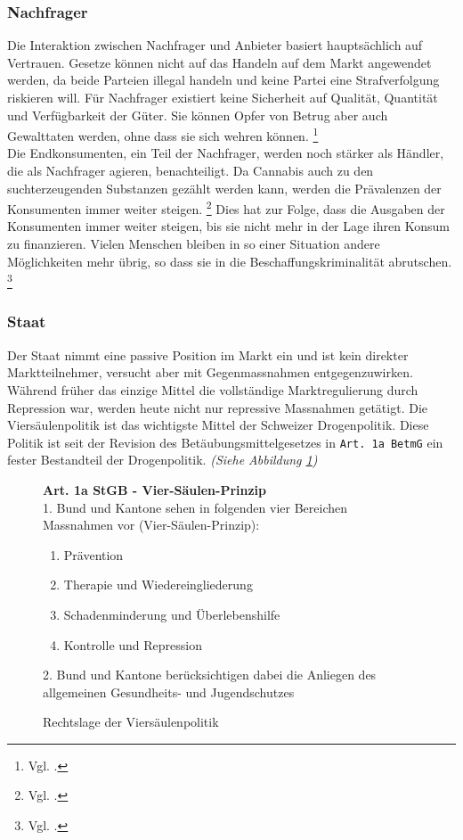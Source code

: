 \documentclass[../main.tex]{subfiles}
\begin{document}
	
	\subsubsection{Nachfrager}
	Die Interaktion zwischen Nachfrager und Anbieter basiert hauptsächlich auf Vertrauen.
	Gesetze können nicht auf das Handeln auf dem Markt angewendet werden, da beide Parteien illegal handeln und keine Partei eine Strafverfolgung riskieren will.
	Für Nachfrager existiert keine Sicherheit auf Qualität, Quantität und Verfügbarkeit der Güter.
	Sie können Opfer von Betrug aber auch Gewalttaten werden, ohne dass sie sich wehren können.%
	\footnote{Vgl. \cite{departmentofjustice-1994}.}\\
	
	\noindent	
	Die Endkonsumenten, ein Teil der Nachfrager, werden noch stärker als Händler, die als Nachfrager agieren, benachteiligt.
	Da Cannabis auch zu den suchterzeugenden Substanzen gezählt werden kann, werden die Prävalenzen der Konsumenten immer weiter steigen.%
	\footnote{Vgl. \cite{becker}.}
	Dies hat zur Folge, dass die Ausgaben der Konsumenten immer weiter steigen, bis sie nicht mehr in der Lage ihren Konsum zu finanzieren.
	Vielen Menschen bleiben in so einer Situation andere Möglichkeiten mehr übrig, so dass sie in die Beschaffungskriminalität abrutschen.%
	\footnote{Vgl. \cite{departmentofjustice-1994}.}
	
	
	\subsubsection{Staat}
	Der Staat nimmt eine passive Position im Markt ein und ist kein direkter Marktteilnehmer, versucht aber mit Gegenmassnahmen entgegenzuwirken.
	Während früher das einzige Mittel die vollständige Marktregulierung durch Repression war, werden heute nicht nur repressive Massnahmen getätigt.
	Die Viersäulenpolitik ist das wichtigste Mittel der Schweizer Drogenpolitik.
	Diese Politik ist seit der Revision des Betäubungsmittelgesetzes in \texttt{Art. 1a BetmG} ein fester Bestandteil der Drogenpolitik.
	\textit{(Siehe Abbildung \ref{fig:stgb-art-1a})}
	
	\begin{figure}[H]
	\begin{tcolorbox}
		\small
	 	\textbf{Art. 1a StGB - Vier-Säulen-Prinzip}\\[7pt]
	 	1. \quad Bund und Kantone sehen in folgenden vier Bereichen Massnahmen vor (Vier-Säulen-Prinzip):
		\begin{enumerate}[label=\alph*.]
			\item Prävention
			\item Therapie und Wiedereingliederung
			\item Schadenminderung und Überlebenshilfe
			\item Kontrolle und Repression
		\end{enumerate}
		2. \quad Bund und Kantone berücksichtigen dabei die Anliegen des allgemeinen Gesundheits- und Jugendschutzes
	\end{tcolorbox}	
	\captionsetup{font=small, skip=0pt}
	\caption{Rechtslage der Viersäulenpolitik}
	\label{fig:stgb-art-1a}
	\end{figure}
	 
\end{document}
